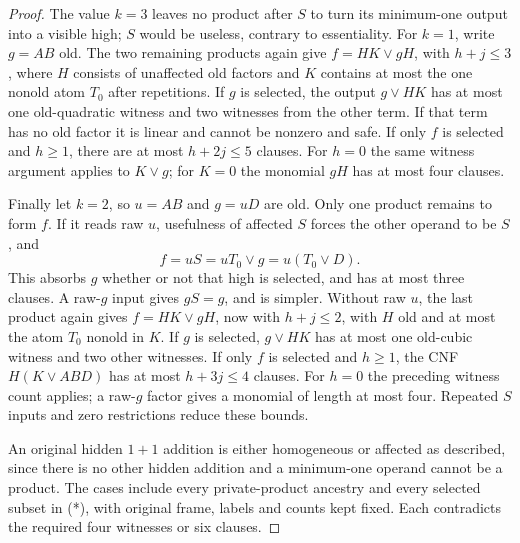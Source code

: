 \documentclass[11pt]{article}
\theoremstyle{definition}
\theoremstyle{remark}
\begin{document}
\begin{proof}
The value $k=3$ leaves no product after $S$ to turn its minimum-one output
into a visible high; $S$ would be useless, contrary to essentiality.
For $k=1$, write $g=AB$ old. The two remaining products again give
$f=HK\vee gH$, with $h+j\le3$, where $H$ consists of unaffected old
factors and $K$ contains at most the one nonold atom $T_0$ after repetitions.
If $g$ is selected, the output $g\vee HK$ has at most one old-quadratic
witness and two witnesses from the other term. If that term has no old
factor it is linear and cannot be nonzero and safe. If only $f$ is selected
and $h\ge1$, there are at most $h+2j\le5$ clauses.
For $h=0$ the same witness argument applies to $K\vee g$; for $K=0$ the
monomial $gH$ has at most four clauses.

Finally let $k=2$, so $u=AB$ and $g=uD$ are old. Only one product remains
to form $f$. If it reads raw $u$, usefulness of affected $S$ forces the
other operand to be $S$, and
\[
 f=uS=uT_0\vee g=u(T_0\vee D).
\]
This absorbs $g$ whether or not that high is selected, and has at most three
clauses. A raw-$g$ input gives $gS=g$, and is simpler.
Without raw $u$, the last product again gives $f=HK\vee gH$, now with
$h+j\le2$, with $H$ old and at most the atom $T_0$ nonold in $K$.
If $g$ is selected, $g\vee HK$ has at most one old-cubic witness and two
other witnesses. If only $f$ is selected and $h\ge1$, the CNF
$H(K\vee ABD)$ has at most $h+3j\le4$ clauses. For $h=0$ the preceding
witness count applies; a raw-$g$ factor gives a monomial of length at most
four. Repeated $S$ inputs and zero restrictions reduce these bounds.

An original hidden $1+1$ addition is either homogeneous or affected as
described, since there is no other hidden addition and a minimum-one operand
cannot be a product. The cases include every private-product ancestry and
every selected subset in (*), with original frame, labels and counts kept
fixed. Each contradicts the required four witnesses or six clauses.
\end{proof}
\end{document}
